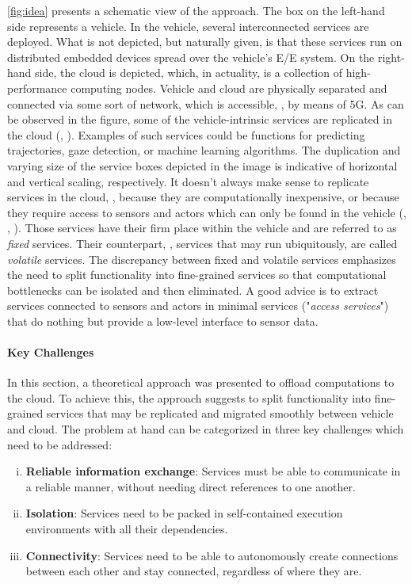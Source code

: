 \autoref{fig:idea} presents a schematic view of the approach. The box on the left-hand side represents a vehicle. In the vehicle, several interconnected services are deployed. What is not depicted, but naturally given, is that these services run on distributed embedded devices spread over the vehicle's E/E system. On the right-hand side, the cloud is depicted, which, in actuality, is a collection of high-performance computing nodes. Vehicle and cloud are physically separated and connected via some sort of network, which is accessible, \eg , by means of 5G. As can be observed in the figure, some of the vehicle-intrinsic services are replicated in the cloud (, ). Examples of such services could be functions for predicting trajectories, gaze detection, or machine learning algorithms. The duplication and varying size of the service boxes depicted in the image is indicative of horizontal and vertical scaling, respectively. It doesn't always make sense to replicate services in the cloud, \eg , because they are computationally inexpensive, or because they require access to sensors and actors which can only be found in the vehicle (, , ). Those services have their firm place within the vehicle and are referred to as \emph{fixed} services. Their counterpart, \ie , services that may run ubiquitously, are called \emph{volatile} services. The discrepancy between fixed and volatile services emphasizes the need to split functionality into fine-grained services so that computational bottlenecks can be isolated and then eliminated. A good advice is to extract services connected to sensors and actors in minimal services ("\emph{access services}") that do nothing but provide a low-level interface to sensor data.

\paragraph{Key Challenges}

In this section, a theoretical approach was presented to offload computations to the cloud. To achieve this, the approach suggests to split functionality into fine-grained services that may be replicated and migrated smoothly between vehicle and cloud. The problem at hand can be categorized in three key challenges which need to be addressed:

\begin{enumerate}[(i)]
\item \textbf{Reliable information exchange}: Services must be able to communicate in a reliable manner, without needing direct references to one another.
\item \textbf{Isolation}: Services need to be packed in self-contained execution environments with all their dependencies.
\item \textbf{Connectivity}: Services need to be able to autonomously create connections between each other and stay connected, regardless of where they are.
\end{enumerate}

